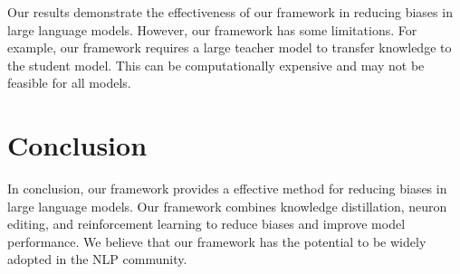 \documentclass{article}
\begin{document}
Our results demonstrate the effectiveness of our framework in reducing biases in large language models. However, our framework has some limitations. For example, our framework requires a large teacher model to transfer knowledge to the student model. This can be computationally expensive and may not be feasible for all models.

\section{Conclusion}

In conclusion, our framework provides a effective method for reducing biases in large language models. Our framework combines knowledge distillation, neuron editing, and reinforcement learning to reduce biases and improve model performance. We believe that our framework has the potential to be widely adopted in the NLP community.



\end{document}
